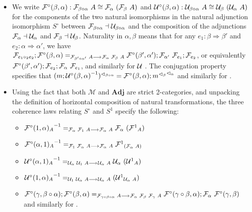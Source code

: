 \documentclass{drl-common/llncs}
\newcommand{\inv}[1]{\ensuremath{{#1}^{-1}}}
\newcommand{\M}{\ensuremath{\mathcal{M}}}
\newcommand{\la}{\ensuremath{\dashv}}
\newcommand{\arrow}[3]{\ensuremath{#2 \longrightarrow_{#1} #3}}
\newcommand{\tc}[2]{\ensuremath{#1 \Rightarrow #2}}
\newcommand{\Adj}{\textbf{Adj}}
\newcommand\compo[2]{\ensuremath{#1 \circ #2}}
\newcommand\comph[2]{\ensuremath{#1 \mathbin{\circ_2} #2}}
\begin{document}
\begin{itemize}
\item We write $\semFcomp(\beta,\alpha) : \semF{\compo{\beta}{\alpha}}{A} \iso
  \semF{\alpha}{(\semF \beta A)}$ and $\semUcomp(\beta,\alpha) :
  \semU{\compo{\beta}{\alpha}}{A} \iso \semU{\beta}{(\semU{\alpha}{A})}$
  for the components of the two natural isomorphisms in the 
  natural adjunction isomorphism $S^\circ$ between $\semFo{\compo{\beta}{\alpha}}
  \la \semUo{\compo{\beta}{\alpha}}$ and the composition of the
  adjunctions $\semFo{\alpha} \la \semUo{\alpha}$ and
  $\semFo{\beta} \la \semUo{\beta}$.  
  Naturality in $\alpha,\beta$ means that 
  for any 
  $e_1 : \tc{\beta}{\beta'}$ and $e_2 : \tc{\alpha}{\alpha'}$, 
  we have
  $ \semFo{\comph{e_1}{e_2}};\semFcomp(\beta,\alpha) =_{\arrow{}{\semF{\compo{\beta'}{\alpha'}}{A}}{\semF{\alpha}{\semF{\beta}{A}}}}
  \semFcomp(\beta',\alpha');\semF{\alpha'}{\semFo{e_1}};{\semFo{e_2}}$,
  or equivalently 
  $\mathcal{F}^\circ(\beta',\alpha');{{\mathcal{F}_{e_2}}};\mathcal{F}_{\alpha} \,\, {\mathcal{F}_{e_1}}$,
  and similarly for $\mathcal{U}_{} \,\, $.
  The conjugation property specifies that 
  $\semrtol{(m;\inv{\semUcomp(\beta,\alpha)})}{\compo{\beta}{\alpha}} = \semFcomp(\beta,\alpha);\semrtol{{\semrtol{m}{\beta}}}{\alpha}$
  and similarly for \semltor{-}{}.  


\item Using the fact that both $\M$ and $\Adj$ are strict 2-categories,
  and unpacking the definition of horizontal composition of natural
  transformations, the three coherence laws relating $S^\circ$ and $S^1$
  specify the following: 
  \begin{itemize}
  \item 
    $\inv{\semFcomp(1,\alpha)_A}
    =_{\arrow{}{\semF{\alpha}{\semF{1}{A}}}{\semF{\alpha}{A}}}
    \semF{\alpha}{(\semFone_A)}$
  \item $\inv{\semFcomp(\alpha,1)_{A}} =_{\arrow{}{\semF{1}{\semF{\alpha}{A}}}{\semF{\alpha}{A}}} \semFone_{(\semF{\alpha}{A})}$
  \item $\inv{\semUcomp(\alpha,1)_A}
    =_{\arrow{}{\semU{\alpha}{\semU{1}{A}}}{\semU{\alpha}{A}}}
    \semU{\alpha}{(\semUone_A)}$
  \item $\inv{\semUcomp(1,\alpha)_A} =_{\arrow{}{\semU{1}{\semU{\alpha}{A}}}{\semU{\alpha}{A}}} {(\semUone_{\semU{\alpha}{A}})}$
  \item
    $\semFcomp(\gamma,\compo{\beta}{\alpha});\semFcomp(\beta,\alpha)
  =_{\arrow{}{\semF{\compo{\gamma}{\compo{\beta}{\alpha}}}{A}}{\semF{\alpha}{\semF{\beta}{\semF{\gamma}{A}}}}}
  \semFcomp(\compo{\gamma}{\beta},\alpha);\semF{\alpha}{\semFcomp(\gamma,\beta)}$
  and similarly for \semU{}{}.
  \end{itemize}

\end{itemize}
\end{document}
